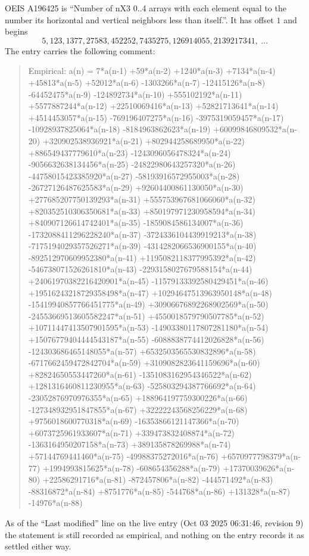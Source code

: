 \documentclass[11pt,a4paper]{article}
\theoremstyle{plain}
\theoremstyle{definition}
\begin{document}
OEIS A196425 is ``Number of nX3 0..4 arrays with each element equal to the number its horizontal and vertical neighbors less than itself.''. It has offset $1$ and begins
\[
5, 123, 1377, 27583, 452252, 7435275, 126914055, 2139217341,\ \dots
\]
The entry carries the following comment:
\begin{quote}\small
Empirical: a(n) = 7*a(n-1) +59*a(n-2) +1240*a(n-3) +7134*a(n-4) +45813*a(n-5) +52012*a(n-6) -1303266*a(n-7) -12415126*a(n-8) -64452475*a(n-9) -124892734*a(n-10) +555102192*a(n-11) +5577887244*a(n-12) +22510069416*a(n-13) +52821713641*a(n-14) +4514453057*a(n-15) -769196407275*a(n-16) -3975319059457*a(n-17) -10928937825064*a(n-18) -8184963862623*a(n-19) +60099846809532*a(n-20) +320902538936921*a(n-21) +802944258689950*a(n-22) +886549437779610*a(n-23) -1243096056478324*a(n-24) -9056632638134456*a(n-25) -24822980643257320*a(n-26) -44758015423385920*a(n-27) -58193916572955003*a(n-28) -26727126487625583*a(n-29) +92604400861130050*a(n-30) +277685207750139293*a(n-31) +555753967681066060*a(n-32) +820352510306350681*a(n-33) +850197971230958594*a(n-34) +840907126614742401*a(n-35) -1859084586134007*a(n-36) -1732088411296228240*a(n-37) -3724336104439919213*a(n-38) -7175194029357526271*a(n-39) -4314282066536900155*a(n-40) -892512970609952380*a(n-41) +1195082118377995392*a(n-42) -546738071526261810*a(n-43) -2293158027679588154*a(n-44) +24061970382216420901*a(n-45) -11579133392580429451*a(n-46) +19516243218729358498*a(n-47) +10294647513963950148*a(n-48) -15419940857766451775*a(n-49) +30906676892268902569*a(n-50) -24553669513605582247*a(n-51) +4550018579790507785*a(n-52) +10711447413507901595*a(n-53) -14903380117807281180*a(n-54) +15076779404444543187*a(n-55) -6088838774412026828*a(n-56) -124303686465148055*a(n-57) +6532503565530832896*a(n-58) -6717662459472842704*a(n-59) +3109082823641159696*a(n-60) +82824650553447260*a(n-61) -1351083162954346522*a(n-62) +1281316460811230955*a(n-63) -525803294387766692*a(n-64) -23052876970976355*a(n-65) +188964197759300226*a(n-66) -127348932951847855*a(n-67) +32222243568256229*a(n-68) +9756018600770318*a(n-69) -16353866121147366*a(n-70) +6073725961933607*a(n-71) +339473832408874*a(n-72) -1363164950207158*a(n-73) +389135878269988*a(n-74) +57144769441460*a(n-75) -49988375272016*a(n-76) +6570977798379*a(n-77) +1994993815625*a(n-78) -608654356288*a(n-79) +17370039626*a(n-80) +22586291716*a(n-81) -872457806*a(n-82) -444571492*a(n-83) -88316872*a(n-84) +8751776*a(n-85) -544768*a(n-86) +131328*a(n-87) -14976*a(n-88)
\end{quote}
As of the ``Last modified'' line on the live entry (Oct 03 2025 06:31:46, revision 9) the statement is
still recorded as empirical, and nothing on the entry records it as settled either way.
\end{document}
